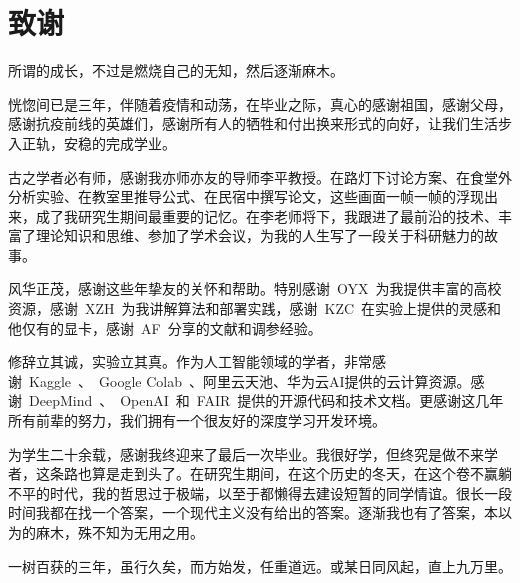

\chapter*{致\quad 谢}

所谓的成长，不过是燃烧自己的无知，然后逐渐麻木。

恍惚间已是三年，伴随着疫情和动荡，在毕业之际，真心的感谢祖国，感谢父母，感谢抗疫前线的英雄们，感谢所有人的牺牲和付出换来形式的向好，让我们生活步入正轨，安稳的完成学业。

古之学者必有师，感谢我亦师亦友的导师李平教授。在路灯下讨论方案、在食堂外分析实验、在教室里推导公式、在民宿中撰写论文，这些画面一帧一帧的浮现出来，成了我研究生期间最重要的记忆。在李老师将下，我跟进了最前沿的技术、丰富了理论知识和思维、参加了学术会议，为我的人生写了一段关于科研魅力的故事。

风华正茂，感谢这些年挚友的关怀和帮助。特别感谢~OYX~为我提供丰富的高校资源，感谢~XZH~为我讲解算法和部署实践，感谢~KZC~在实验上提供的灵感和他仅有的显卡，感谢~AF~分享的文献和调参经验。

修辞立其诚，实验立其真。作为人工智能领域的学者，非常感谢~Kaggle~、~Google Colab~、阿里云天池、华为云AI提供的云计算资源。感谢~DeepMind~、~OpenAI~和~FAIR~提供的开源代码和技术文档。更感谢这几年所有前辈的努力，我们拥有一个很友好的深度学习开发环境。

为学生二十余载，感谢我终迎来了最后一次毕业。我很好学，但终究是做不来学者，这条路也算是走到头了。在研究生期间，在这个历史的冬天，在这个卷不赢躺不平的时代，我的哲思过于极端，以至于都懒得去建设短暂的同学情谊。很长一段时间我都在找一个答案，一个现代主义没有给出的答案。逐渐我也有了答案，本以为的麻木，殊不知为无用之用。

一树百获的三年，虽行久矣，而方始发，任重道远。或某日同风起，直上九万里。










